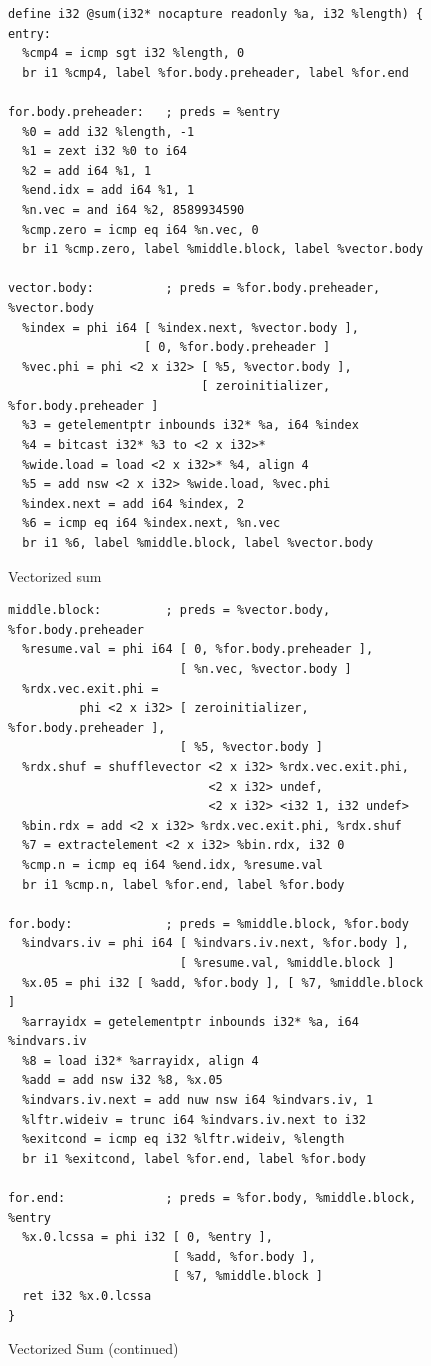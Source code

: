 \documentclass[a4paper,bibliography=totocnumbered,parskip,headsepline]{scrbook}
\begin{document}
\begin{figure}[!htpb]
\caption{Vectorized sum}
\label{fig:sumllvec}
\begin{lstlisting}
define i32 @sum(i32* nocapture readonly %a, i32 %length) {
entry:
  %cmp4 = icmp sgt i32 %length, 0
  br i1 %cmp4, label %for.body.preheader, label %for.end

for.body.preheader:   ; preds = %entry
  %0 = add i32 %length, -1
  %1 = zext i32 %0 to i64
  %2 = add i64 %1, 1
  %end.idx = add i64 %1, 1
  %n.vec = and i64 %2, 8589934590
  %cmp.zero = icmp eq i64 %n.vec, 0
  br i1 %cmp.zero, label %middle.block, label %vector.body

vector.body:          ; preds = %for.body.preheader, %vector.body
  %index = phi i64 [ %index.next, %vector.body ],
                   [ 0, %for.body.preheader ]
  %vec.phi = phi <2 x i32> [ %5, %vector.body ],
                           [ zeroinitializer, %for.body.preheader ]
  %3 = getelementptr inbounds i32* %a, i64 %index
  %4 = bitcast i32* %3 to <2 x i32>*
  %wide.load = load <2 x i32>* %4, align 4
  %5 = add nsw <2 x i32> %wide.load, %vec.phi
  %index.next = add i64 %index, 2
  %6 = icmp eq i64 %index.next, %n.vec
  br i1 %6, label %middle.block, label %vector.body
\end{lstlisting}
\end{figure}

\begin{figure}
\ContinuedFloat
\begin{lstlisting}
middle.block:         ; preds = %vector.body, %for.body.preheader
  %resume.val = phi i64 [ 0, %for.body.preheader ],
                        [ %n.vec, %vector.body ]
  %rdx.vec.exit.phi =
          phi <2 x i32> [ zeroinitializer, %for.body.preheader ],
                        [ %5, %vector.body ]
  %rdx.shuf = shufflevector <2 x i32> %rdx.vec.exit.phi,
                            <2 x i32> undef,
                            <2 x i32> <i32 1, i32 undef>
  %bin.rdx = add <2 x i32> %rdx.vec.exit.phi, %rdx.shuf
  %7 = extractelement <2 x i32> %bin.rdx, i32 0
  %cmp.n = icmp eq i64 %end.idx, %resume.val
  br i1 %cmp.n, label %for.end, label %for.body

for.body:             ; preds = %middle.block, %for.body
  %indvars.iv = phi i64 [ %indvars.iv.next, %for.body ],
                        [ %resume.val, %middle.block ]
  %x.05 = phi i32 [ %add, %for.body ], [ %7, %middle.block ]
  %arrayidx = getelementptr inbounds i32* %a, i64 %indvars.iv
  %8 = load i32* %arrayidx, align 4
  %add = add nsw i32 %8, %x.05
  %indvars.iv.next = add nuw nsw i64 %indvars.iv, 1
  %lftr.wideiv = trunc i64 %indvars.iv.next to i32
  %exitcond = icmp eq i32 %lftr.wideiv, %length
  br i1 %exitcond, label %for.end, label %for.body

for.end:              ; preds = %for.body, %middle.block, %entry
  %x.0.lcssa = phi i32 [ 0, %entry ],
                       [ %add, %for.body ],
                       [ %7, %middle.block ]
  ret i32 %x.0.lcssa
}
\end{lstlisting}
\caption[]{Vectorized Sum (continued)}
\end{figure}
\end{document}

